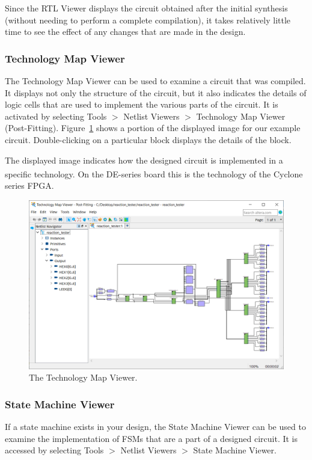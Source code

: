\documentclass[11pt, twoside, pdftex]{article}
\begin{document}
Since the RTL Viewer displays the circuit obtained after the initial synthesis
(without needing to perform a complete compilation), it takes relatively little time 
to see the effect of any changes that are made in the design. 

\subsubsection{Technology Map Viewer}
The Technology Map Viewer can be used to examine a circuit that was compiled.
It displays not only the structure of the circuit, but it also indicates
the details of logic cells that are used to implement the various parts of the circuit.
It is activated by selecting {\sf Tools $>$ Netlist Viewers $>$ Technology Map Viewer (Post-Fitting)}.
Figure~\ref{fig:17} shows a portion of the displayed image for our example circuit.
Double-clicking on a particular block displays the details of the block.

The displayed image indicates how the designed circuit is implemented in a specific
technology. On the DE-series board this is the technology of the Cyclone\textsuperscript{\textregistered} series FPGA.

\begin{figure}[H]
   \begin{center}
      \includegraphics[scale=0.6]{figures/figure17.png}
   \caption{The Technology Map Viewer.} 
	 \label{fig:17}
	 \end{center}
\end{figure}

\subsubsection{State Machine Viewer}
If a state machine exists in your design, the State Machine Viewer can be used to examine the implementation of FSMs that are
a part of a designed circuit. It is accessed by selecting
{\sf Tools $>$ Netlist Viewers $>$ State Machine Viewer}.
\end{document}
